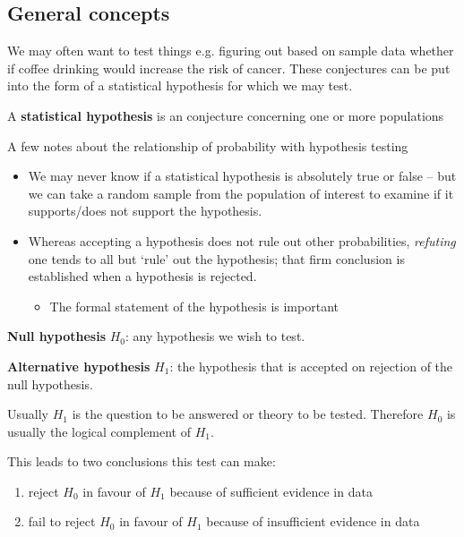 \documentclass[10pt]{article}
\begin{document}
\subsection{General concepts}


We may often want to test things e.g. figuring out based on sample data whether if coffee drinking would increase the risk of cancer. 
These conjectures can be put into the form of a statistical hypothesis for which we may test.

\begin{definition}
	A \textbf{statistical hypothesis} is an conjecture concerning one or more populations
\end{definition}

A few notes about the relationship of probability with hypothesis testing

\begin{itemize}
	\item We may never know if a statistical hypothesis is absolutely true or false -- but we can take a random sample from the population of interest to examine if it supports/does not support the hypothesis.
	\item Whereas accepting a hypothesis does not rule out other probabilities, \textit{refuting} one tends to all but `rule' out the hypothesis; that firm conclusion is established when a hypothesis is rejected.
		\begin{itemize}
			\item The formal statement of the hypothesis is important
		\end{itemize}
\end{itemize}

\begin{definition}
	\textbf{Null hypothesis} $ H_0 $: any hypothesis we wish to test.

	\textbf{Alternative hypothesis} $ H_1 $: the hypothesis that is accepted on rejection of the null hypothesis.

	Usually $ H_1 $ is the question to be answered or theory to be tested.
	Therefore $ H_0 $ is usually the logical complement of $ H_1 $.

\end{definition}


This leads to two conclusions this test can make:

\begin{enumerate}
	\item reject $ H_0 $ in favour of $ H_1 $ because of sufficient evidence in data
	\item fail to reject $ H_0 $ in favour of $ H_1 $ because of insufficient evidence in data
\end{enumerate}
\end{document}
